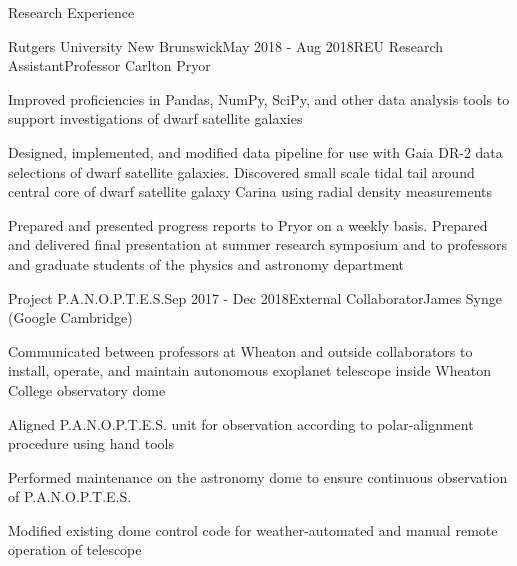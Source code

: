 \documentclass{resume} %
\begin{document}
\begin{rSection}{Research Experience}
\begin{rSubsection}{Rutgers University New Brunswick}{May 2018 - Aug 2018}{REU Research Assistant}{Professor Carlton Pryor}
\item Improved proficiencies in Pandas, NumPy, SciPy, and other data analysis tools to support investigations of dwarf satellite galaxies
\item Designed, implemented, and modified data pipeline for use with Gaia DR-2 data selections of dwarf satellite galaxies. Discovered small scale tidal tail around central core of dwarf satellite galaxy Carina using radial density measurements
\item Prepared and presented progress reports to Pryor on a weekly basis. Prepared and delivered final presentation at summer research symposium and to professors and graduate students of the physics and astronomy department
\end{rSubsection}

\begin{rSubsection}{Project P.A.N.O.P.T.E.S.}{Sep 2017 - Dec 2018}{External Collaborator}{James Synge (Google Cambridge)}
\item Communicated between professors at Wheaton and outside collaborators to install, operate, and maintain autonomous exoplanet telescope inside Wheaton College observatory dome
\item Aligned P.A.N.O.P.T.E.S. unit for observation according to polar-alignment procedure using hand tools
\item Performed maintenance on the astronomy dome to ensure continuous observation of P.A.N.O.P.T.E.S.
\item Modified existing dome control code for weather-automated and manual remote operation of telescope
\end{rSubsection}


\end{rSection}
\end{document}
